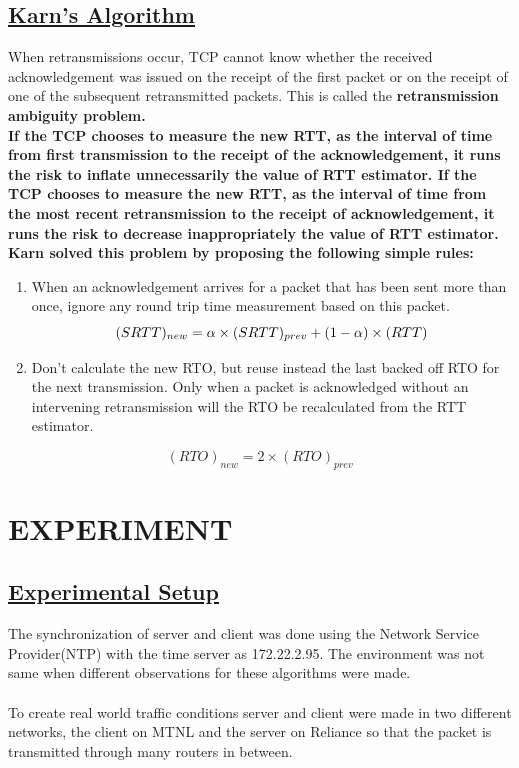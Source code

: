 \documentclass[12pt]{article}
\begin{document}
\subsection{\underline{Karn's Algorithm}}
When retransmissions occur, TCP cannot know whether the received acknowledgement was issued on the receipt of the first packet or on the receipt of one of the subsequent retransmitted packets. This is called the \bf retransmission ambiguity problem\rm.\\
If the TCP chooses to measure the new RTT, as the interval of time from first transmission to the receipt of the acknowledgement, it runs the risk to inflate unnecessarily the value of RTT estimator. If the TCP chooses to measure the new RTT, as the interval of time from the most recent retransmission to the receipt of acknowledgement, it runs the risk to decrease inappropriately the value of RTT estimator.\\
Karn solved this problem by proposing the following simple rules:
\begin{enumerate}
\item When an acknowledgement arrives for a packet that has been sent more than once, ignore any round trip time measurement based on this packet.
\[
(SRTT)_{new} =  \alpha \times (SRTT)_{prev} + (1-\alpha )\times (RTT)\\
\]
\item Don’t calculate the new RTO, but reuse instead the last backed off RTO for the next transmission. Only when a packet is acknowledged without an intervening retransmission will the RTO be recalculated from the RTT estimator.
\end{enumerate}
\[
(RTO)_{new} = 2\times (RTO)_{prev}
\]
\section{EXPERIMENT}
\subsection{\underline{Experimental Setup}}
The synchronization of server and client was done using the Network Service Provider(NTP) with the time server as 172.22.2.95. The environment was not same when different observations for these algorithms were made.\\ \\
To create real world traffic conditions server and client were made in two different networks, the client on MTNL and the server on Reliance so that the packet is transmitted through many routers in between.
\end{document}
